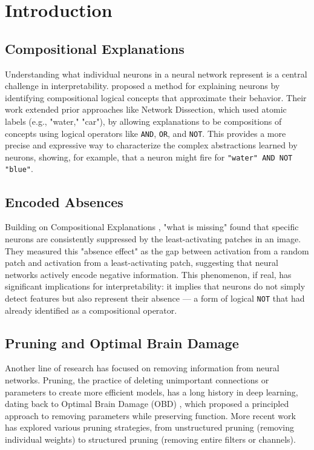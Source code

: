 \section{\textbf{Introduction}}

\subsection{\textbf{Compositional Explanations}}

Understanding what individual neurons in a neural network represent is a central challenge in interpretability. \cite{compex} proposed a method for explaining neurons by identifying compositional logical concepts that approximate their behavior. Their work extended prior approaches like Network Dissection, which used atomic labels (e.g., "water," "car"), by allowing explanations to be compositions of concepts using logical operators like \texttt{AND}, \texttt{OR}, and \texttt{NOT}. This provides a more precise and expressive way to characterize the complex abstractions learned by neurons, showing, for example, that a neuron might fire for \texttt{"water" AND NOT "blue"}.

\subsection{\textbf{Encoded Absences}}

Building on Compositional Explanations \cite{compex}, "what is missing" \cite{whatismissing} found that specific neurons are consistently suppressed by the least-activating patches in an image. They measured this "absence effect" as the gap between activation from a random patch and activation from a least-activating patch, suggesting that neural networks actively encode negative information. This phenomenon, if real, has significant implications for interpretability: it implies that neurons do not simply detect features but also represent their absence — a form of logical \texttt{NOT} that \cite{compex} had already identified as a compositional operator.

\subsection{\textbf{Pruning and Optimal Brain Damage}}

Another line of research has focused on removing information from neural networks. Pruning, the practice of deleting unimportant connections or parameters to create more efficient models, has a long history in deep learning, dating back to Optimal Brain Damage (OBD) \cite{optimalbraindamage}, which proposed a principled approach to removing parameters while preserving function. More recent work has explored various pruning strategies, from unstructured pruning (removing individual weights) to structured pruning (removing entire filters or channels).

